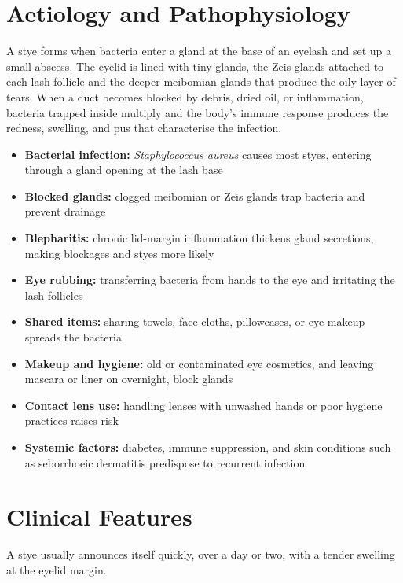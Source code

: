 \section*{Aetiology and Pathophysiology}
A stye forms when bacteria enter a gland at the base of an eyelash and set up a small abscess. The eyelid is lined with tiny glands, the Zeis glands attached to each lash follicle and the deeper meibomian glands that produce the oily layer of tears. When a duct becomes blocked by debris, dried oil, or inflammation, bacteria trapped inside multiply and the body's immune response produces the redness, swelling, and pus that characterise the infection.

\begin{itemize}
    \item \textbf{Bacterial infection:} \textit{Staphylococcus aureus} causes most styes, entering through a gland opening at the lash base
    \item \textbf{Blocked glands:} clogged meibomian or Zeis glands trap bacteria and prevent drainage
    \item \textbf{Blepharitis:} chronic lid-margin inflammation thickens gland secretions, making blockages and styes more likely
    \item \textbf{Eye rubbing:} transferring bacteria from hands to the eye and irritating the lash follicles
    \item \textbf{Shared items:} sharing towels, face cloths, pillowcases, or eye makeup spreads the bacteria
    \item \textbf{Makeup and hygiene:} old or contaminated eye cosmetics, and leaving mascara or liner on overnight, block glands
    \item \textbf{Contact lens use:} handling lenses with unwashed hands or poor hygiene practices raises risk
    \item \textbf{Systemic factors:} diabetes, immune suppression, and skin conditions such as seborrhoeic dermatitis predispose to recurrent infection
\end{itemize}

\section*{Clinical Features}
A stye usually announces itself quickly, over a day or two, with a tender swelling at the eyelid margin.

